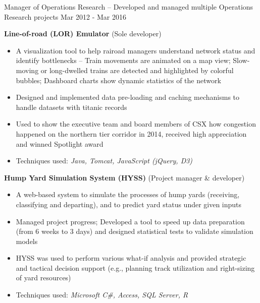 \begin{cventries}
\cventry
{Manager of Operations Research \tiny{-- Developed and managed multiple Operations Research projects}}         %
{}                                       %
{}                                       %
{Mar 2012 - Mar 2016}                    %
{                                        %
    \begin{cvitems}  
        \item {
\textbf{Line-of-road (LOR) Emulator} {(Sole developer)} 
\begin{itemize}
    \item  A visualization tool to help rairoad managers understand network status and identify bottlenecks -- Train movements are animated on a map view; Slow-moving or long-dwelled trains are detected and highlighted by colorful bubbles; Dashboard charts show dynamic statistics of the network
    \item  Designed and implemented data pre-loading and caching mechanisms to handle datasets with titanic records
    \item  Used to show the executive team and board members of CSX how congestion happened on the northern tier corridor in 2014, received high appreciation and winned Spotlight award
    \item  Techniques used: \textit{Java, Tomcat, JavaScript (jQuery, D3)}
\end{itemize} 
		}
        \item {
\textbf{Hump Yard Simulation System (HYSS)} {(Project manager \& developer)}
\begin{itemize}
    \item  A web-based system to simulate the processes of hump yards (receiving, classifying and departing), and to predict yard status under given inputs
    \item  Managed project progress; Developed a tool to speed up data preparation (from 6 weeks to 3 days) and designed statistical tests to validate simulation models
    \item  HYSS was used to perform various what-if analysis and provided strategic and tactical decision support (e.g., planning track utilization and right-sizing of yard resources)
    \item  Techniques used: \textit{Microsoft C\#, Access, SQL Server, R}
\end{itemize}     
        }
    \end{cvitems}
}



\end{cventries}
